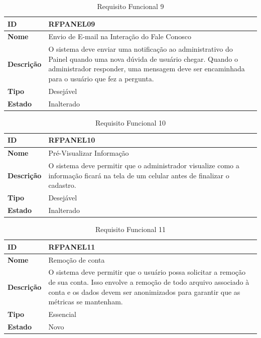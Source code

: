 \begin{table}[H]
\centering
\begin{tabular}{|l|p{12cm}|}
\hline
\textbf{ID} & RFPANEL09 \\
\hline
\textbf{Nome} & Envio de E-mail na Interação do Fale Conosco \\
\hline
\textbf{Descrição} & O sistema deve enviar uma notificação ao administrativo do Painel quando uma nova dúvida de usuário chegar. Quando o administrador responder, uma mensagem deve ser encaminhada para o usuário que fez a pergunta. \\
\hline
\textbf{Tipo} & Desejável \\
\hline
\textbf{Estado} & Inalterado \\
\hline
\end{tabular}
\caption[RFPANEL09 -- Enviar e-mail na interação do Fale Conosco]{Requisito Funcional 9}
\label{tab:rfpanel09}
\end{table}

\begin{table}[H]
\centering
\begin{tabular}{|l|p{12cm}|}
\hline
\textbf{ID} & RFPANEL10 \\
\hline
\textbf{Nome} & Pré-Visualizar Informação \\
\hline
\textbf{Descrição} & O sistema deve permitir que o administrador visualize como a informação ficará na tela de um celular antes de finalizar o cadastro. \\
\hline
\textbf{Tipo} & Desejável \\
\hline
\textbf{Estado} & Inalterado \\
\hline
\end{tabular}
\caption[RFPANEL10 -- Pré-visualizar informação]{Requisito Funcional 10}
\label{tab:rfpanel10}
\end{table}

\begin{table}[H]
\centering
\begin{tabular}{|l|p{12cm}|}
\hline
\textbf{ID} & RFPANEL11 \\
\hline
\textbf{Nome} & Remoção de conta \\
\hline
\textbf{Descrição} & O sistema deve permitir que o usuário possa solicitar a remoção de sua conta. Isso envolve a remoção de todo arquivo associado à conta e os dados devem ser anonimizados para garantir que as métricas se mantenham. \\
\hline
\textbf{Tipo} & Essencial \\
\hline
\textbf{Estado} & Novo \\
\hline
\end{tabular}
\caption[RFPANEL11 -- Remoção de conta]{Requisito Funcional 11}
\label{tab:rfpanel11}
\end{table}

